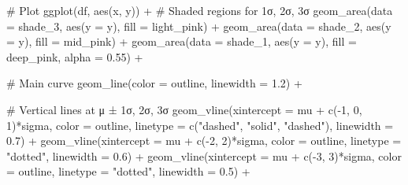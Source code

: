 \documentclass[
  letterpaper,
  DIV=11,
  numbers=noendperiod]{scrreprt}
\newenvironment{Shaded}{\begin{snugshade}}{\end{snugshade}}
\newcommand{\AttributeTok}[1]{\textcolor[rgb]{0.40,0.45,0.13}{#1}}
\newcommand{\CommentTok}[1]{\textcolor[rgb]{0.37,0.37,0.37}{#1}}
\newcommand{\DecValTok}[1]{\textcolor[rgb]{0.68,0.00,0.00}{#1}}
\newcommand{\FloatTok}[1]{\textcolor[rgb]{0.68,0.00,0.00}{#1}}
\newcommand{\FunctionTok}[1]{\textcolor[rgb]{0.28,0.35,0.67}{#1}}
\newcommand{\NormalTok}[1]{\textcolor[rgb]{0.00,0.23,0.31}{#1}}
\newcommand{\SpecialCharTok}[1]{\textcolor[rgb]{0.37,0.37,0.37}{#1}}
\newcommand{\StringTok}[1]{\textcolor[rgb]{0.13,0.47,0.30}{#1}}
\begin{document}
\begin{Shaded}
\begin{Highlighting}[]
\CommentTok{\# Plot}
\FunctionTok{ggplot}\NormalTok{(df, }\FunctionTok{aes}\NormalTok{(x, y)) }\SpecialCharTok{+}
  \CommentTok{\# Shaded regions for 1σ, 2σ, 3σ}
  \FunctionTok{geom\_area}\NormalTok{(}\AttributeTok{data =}\NormalTok{ shade\_3, }\FunctionTok{aes}\NormalTok{(}\AttributeTok{y =}\NormalTok{ y), }\AttributeTok{fill =}\NormalTok{ light\_pink) }\SpecialCharTok{+}
  \FunctionTok{geom\_area}\NormalTok{(}\AttributeTok{data =}\NormalTok{ shade\_2, }\FunctionTok{aes}\NormalTok{(}\AttributeTok{y =}\NormalTok{ y), }\AttributeTok{fill =}\NormalTok{ mid\_pink) }\SpecialCharTok{+}
  \FunctionTok{geom\_area}\NormalTok{(}\AttributeTok{data =}\NormalTok{ shade\_1, }\FunctionTok{aes}\NormalTok{(}\AttributeTok{y =}\NormalTok{ y), }\AttributeTok{fill =}\NormalTok{ deep\_pink, }\AttributeTok{alpha =} \FloatTok{0.55}\NormalTok{) }\SpecialCharTok{+}

  \CommentTok{\# Main curve}
  \FunctionTok{geom\_line}\NormalTok{(}\AttributeTok{color =}\NormalTok{ outline, }\AttributeTok{linewidth =} \FloatTok{1.2}\NormalTok{) }\SpecialCharTok{+}

  \CommentTok{\# Vertical lines at μ ± 1σ, 2σ, 3σ}
  \FunctionTok{geom\_vline}\NormalTok{(}\AttributeTok{xintercept =}\NormalTok{ mu }\SpecialCharTok{+} \FunctionTok{c}\NormalTok{(}\SpecialCharTok{{-}}\DecValTok{1}\NormalTok{, }\DecValTok{0}\NormalTok{, }\DecValTok{1}\NormalTok{)}\SpecialCharTok{*}\NormalTok{sigma,}
             \AttributeTok{color =}\NormalTok{ outline, }\AttributeTok{linetype =} \FunctionTok{c}\NormalTok{(}\StringTok{"dashed"}\NormalTok{, }\StringTok{"solid"}\NormalTok{, }\StringTok{"dashed"}\NormalTok{),}
             \AttributeTok{linewidth =} \FloatTok{0.7}\NormalTok{) }\SpecialCharTok{+}
  \FunctionTok{geom\_vline}\NormalTok{(}\AttributeTok{xintercept =}\NormalTok{ mu }\SpecialCharTok{+} \FunctionTok{c}\NormalTok{(}\SpecialCharTok{{-}}\DecValTok{2}\NormalTok{, }\DecValTok{2}\NormalTok{)}\SpecialCharTok{*}\NormalTok{sigma, }\AttributeTok{color =}\NormalTok{ outline,}
             \AttributeTok{linetype =} \StringTok{"dotted"}\NormalTok{, }\AttributeTok{linewidth =} \FloatTok{0.6}\NormalTok{) }\SpecialCharTok{+}
  \FunctionTok{geom\_vline}\NormalTok{(}\AttributeTok{xintercept =}\NormalTok{ mu }\SpecialCharTok{+} \FunctionTok{c}\NormalTok{(}\SpecialCharTok{{-}}\DecValTok{3}\NormalTok{, }\DecValTok{3}\NormalTok{)}\SpecialCharTok{*}\NormalTok{sigma, }\AttributeTok{color =}\NormalTok{ outline,}
             \AttributeTok{linetype =} \StringTok{"dotted"}\NormalTok{, }\AttributeTok{linewidth =} \FloatTok{0.5}\NormalTok{) }\SpecialCharTok{+}


\end{Highlighting}
\end{Shaded}
\end{document}

